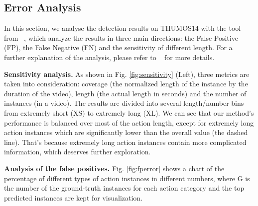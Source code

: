 \documentclass[10pt,twocolumn,letterpaper]{article}
\newcommand{\figref}[1]{Fig. \ref{#1}}
\newcommand{\myPara}[1]{\vspace{.05in}\noindent\textbf{#1}}
\begin{document}
\subsection{Error Analysis}
In this section, we analyse the detection results on THUMOS14 with the tool from ~\cite{alwassel2018diagnosing}, which analyze the results in three main directions: the False Positive (FP), the False Negative (FN) and the sensitivity of different length. For a further explanation of the analysis, please refer to ~\cite{alwassel2018diagnosing} for more details. 

\myPara{Sensitivity analysis.}
As shown in \figref{fig:sensitivity} (Left), three metrics are taken into consideration: coverage (the normalized length of the instance by the duration of the video), length (the actual length in seconds) and the number of instances (in a video). The results are divided into several length/number bins from extremely short (XS) to extremely long (XL). We can see that our method's performance is balanced over most of the action length, except for extremely long action instances which are significantly lower than the overall value (the dashed line). That's because extremely long action instances contain more complicated information, which deserves further exploration.

\begin{figure}[t!]
\end{figure}


\begin{figure}[t]
\end{figure}


\myPara{Analysis of the false positives.}
\figref{fig:fperror} shows a chart of the percentage of different types of action instances in different  numbers, where G is the number of the ground-truth instances for each action category and the top  predicted instances are kept for visualization. 
\end{document}
